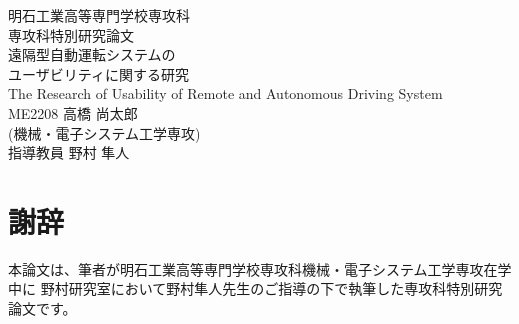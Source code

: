 \documentclass[a4paper,12pt]{jreport}
\begin{document}
\vspace*{2cm}
\thispagestyle{empty}
\begin{spacing}{1}
\begin{center}
{\Large 明石工業高等専門学校専攻科 \\[1truecm]
専攻科特別研究論文} \\[3.5truecm]
\huge 遠隔型自動運転システムの \\
\huge ユーザビリティに関する研究 \\
\LARGE The Research of Usability of Remote and Autonomous Driving System\\[4truecm]
\Large ME2208 高橋 尚太郎 \\
(機械・電子システム工学専攻) \\[1truecm]
指導教員 野村 隼人
\end{center}
\tableofcontents
\end{spacing}

\iftotalfigures
  \listoffigures  %
\fi
\iftotaltables
  \listoftables  %
\fi

\newpage
\clearpage
{}
\pagestyle{fancy}
\setlength{\headheight}{5truemm}










\pagestyle{plain}
\chapter*{謝辞}

本論文は、筆者が明石工業高等専門学校専攻科機械・電子システム工学専攻在学中に
野村研究室において野村隼人先生のご指導の下で執筆した専攻科特別研究論文です。
\end{document}

